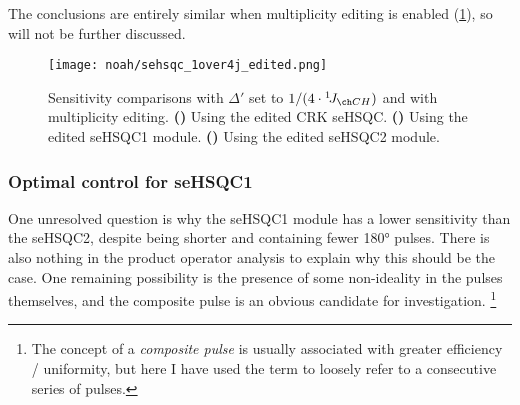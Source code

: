 The conclusions are entirely similar when multiplicity editing is enabled (\cref{fig:noah_sehsqc_1over4j_edited}), so will not be further discussed.

\begin{figure}[!ht]
    \centering
    \texttt{[image: noah/sehsqc\_1over4j\_edited.png]}%
    {\label{fig:noah_sehsqc_1over4j_edited_crk}}%
    {\label{fig:noah_sehsqc_1over4j_edited_1}}%
    {\label{fig:noah_sehsqc_1over4j_edited_2}}%
    \caption[Sensitivity comparisons for edited seHSQC with $\Delta' = 1 / (4 \cdot \oneJ{CH})$]{
        Sensitivity comparisons with $\Delta'$ set to $1 / (4 \cdot \oneJ{CH})$ and with multiplicity editing.
        \textbf{()} Using the edited CRK seHSQC.
        \textbf{()} Using the edited seHSQC1 module.
        \textbf{()} Using the edited seHSQC2 module.
    }
    \label{fig:noah_sehsqc_1over4j_edited}
\end{figure}




\subsubsection{Optimal control for seHSQC1}

One unresolved question is why the seHSQC1 module has a lower sensitivity than the seHSQC2, despite being shorter and containing fewer \ang{180} pulses.
There is also nothing in the product operator analysis to explain why this should be the case.
One remaining possibility is the presence of some non-ideality in the pulses themselves, and the composite \proton{} pulse is an obvious candidate for investigation.%
\footnote{The concept of a \textit{composite pulse}\autocite{Levitt1986PNMRS} is usually associated with greater efficiency / uniformity, but here I have used the term to loosely refer to a consecutive series of pulses.}

